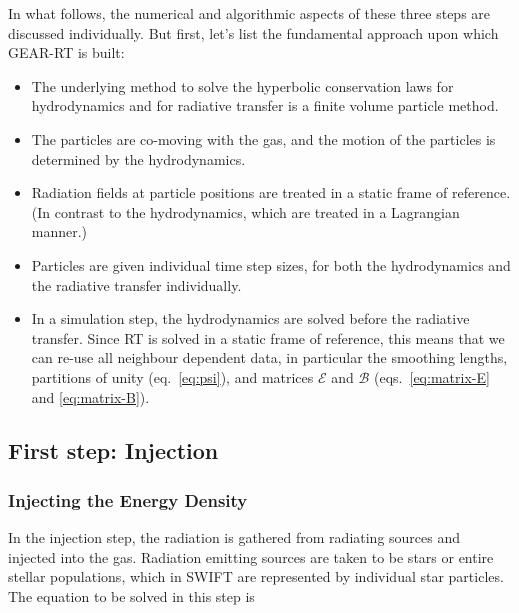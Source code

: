 In what follows, the numerical and algorithmic aspects of these three steps are discussed
individually. But first, let's list the fundamental approach upon which GEAR-RT is built:

\begin{itemize}
\item The underlying method to solve the hyperbolic conservation laws for hydrodynamics and for
radiative transfer is a finite volume particle method.
\item The particles are co-moving with the gas, and the motion of the particles is determined by
the hydrodynamics.
\item Radiation fields at particle positions are treated in a static frame of reference. (In
contrast to the hydrodynamics, which are treated in a Lagrangian manner.)
\item Particles are given individual time step sizes, for both the hydrodynamics and the radiative
transfer individually.
\item In a simulation step, the hydrodynamics are solved before the radiative transfer. Since RT is
solved in a static frame of reference, this means that we can re-use all neighbour dependent data,
in particular the smoothing lengths, partitions of unity (eq.~\ref{eq:psi}), and matrices
$\mathcal{E}$ and $\mathcal{B}$ (eqs.~\ref{eq:matrix-E} and \ref{eq:matrix-B}).
\end{itemize}













\subsection{First step: Injection} \label{chap:injection-step}


\subsubsection{Injecting the Energy Density}


In the injection step, the radiation is gathered from radiating sources and injected into the gas.
Radiation emitting sources are taken to be stars or entire stellar populations, which in SWIFT are
represented by individual star particles. The equation to be solved in this step is

